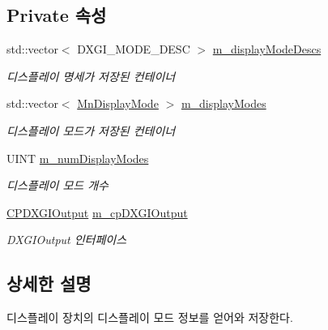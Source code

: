 \subsection*{Private 속성}
\begin{DoxyCompactItemize}
\item 
std\+::vector$<$ D\+X\+G\+I\+\_\+\+M\+O\+D\+E\+\_\+\+D\+E\+SC $>$ \hyperlink{class_m_n_l_1_1_mn_display_device_a496e5f393dc60c67504da2a35a863728}{m\+\_\+display\+Mode\+Descs}
\begin{DoxyCompactList}\small\item\em 디스플레이 명세가 저장된 컨테이너 \end{DoxyCompactList}\item 
std\+::vector$<$ \hyperlink{struct_m_n_l_1_1_mn_display_mode}{Mn\+Display\+Mode} $>$ \hyperlink{class_m_n_l_1_1_mn_display_device_a78c903529f9107d3f5b0fa14d2e4fd34}{m\+\_\+display\+Modes}
\begin{DoxyCompactList}\small\item\em 디스플레이 모드가 저장된 컨테이너 \end{DoxyCompactList}\item 
U\+I\+NT \hyperlink{class_m_n_l_1_1_mn_display_device_abdc40d78874813d1b4ce802a65247464}{m\+\_\+num\+Display\+Modes}
\begin{DoxyCompactList}\small\item\em 디스플레이 모드 개수 \end{DoxyCompactList}\item 
\hyperlink{namespace_m_n_l_ac03add2215d9e5f2938af7887c5b09de}{C\+P\+D\+X\+G\+I\+Output} \hyperlink{class_m_n_l_1_1_mn_display_device_a718cf72ca95ace1f6dcc4d31daea6be9}{m\+\_\+cp\+D\+X\+G\+I\+Output}
\begin{DoxyCompactList}\small\item\em D\+X\+G\+I\+Output 인터페이스 \end{DoxyCompactList}\end{DoxyCompactItemize}


\subsection{상세한 설명}
디스플레이 장치의 디스플레이 모드 정보를 얻어와 저장한다. 

